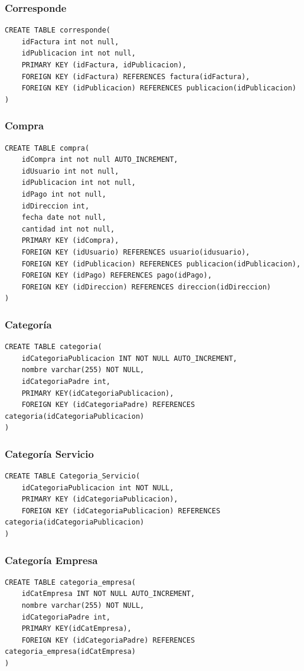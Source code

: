 \documentclass[a4paper, 10pt, twoside]{article}
\begin{document}
\subsubsection{Corresponde}
\begin{verbatim}
CREATE TABLE corresponde(
	idFactura int not null,
    idPublicacion int not null,
    PRIMARY KEY (idFactura, idPublicacion),
    FOREIGN KEY (idFactura) REFERENCES factura(idFactura),
    FOREIGN KEY (idPublicacion) REFERENCES publicacion(idPublicacion)
)
\end{verbatim}
\subsubsection{Compra}
\begin{verbatim}
CREATE TABLE compra(
	idCompra int not null AUTO_INCREMENT,
    idUsuario int not null,
    idPublicacion int not null,
    idPago int not null,
    idDireccion int,
    fecha date not null,
    cantidad int not null,
    PRIMARY KEY (idCompra),
    FOREIGN KEY (idUsuario) REFERENCES usuario(idusuario),
    FOREIGN KEY (idPublicacion) REFERENCES publicacion(idPublicacion),
    FOREIGN KEY (idPago) REFERENCES pago(idPago),
    FOREIGN KEY (idDireccion) REFERENCES direccion(idDireccion)
)

\end{verbatim}
\subsubsection{Categor\'ia}
\begin{verbatim}
CREATE TABLE categoria(
	idCategoriaPublicacion INT NOT NULL AUTO_INCREMENT,
	nombre varchar(255) NOT NULL,
    idCategoriaPadre int,
    PRIMARY KEY(idCategoriaPublicacion),
    FOREIGN KEY (idCategoriaPadre) REFERENCES categoria(idCategoriaPublicacion)
)
\end{verbatim}
\subsubsection{Categor\'ia Servicio}
\begin{verbatim}
CREATE TABLE Categoria_Servicio(
	idCategoriaPublicacion int NOT NULL,
    PRIMARY KEY (idCategoriaPublicacion),
    FOREIGN KEY (idCategoriaPublicacion) REFERENCES categoria(idCategoriaPublicacion)
)
\end{verbatim}
\subsubsection{Categor\'ia Empresa}
\begin{verbatim}
CREATE TABLE categoria_empresa(
	idCatEmpresa INT NOT NULL AUTO_INCREMENT,
	nombre varchar(255) NOT NULL,
    idCategoriaPadre int,
    PRIMARY KEY(idCatEmpresa),
    FOREIGN KEY (idCategoriaPadre) REFERENCES categoria_empresa(idCatEmpresa)
)
\end{verbatim}
\end{document}
